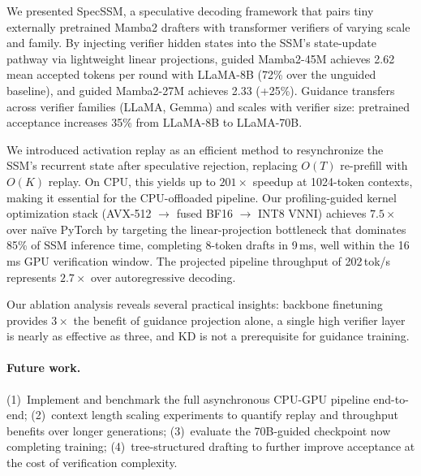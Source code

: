 We presented SpecSSM, a speculative decoding framework that pairs tiny externally pretrained Mamba2 drafters with transformer verifiers of varying scale and family.
By injecting verifier hidden states into the SSM's state-update pathway via lightweight linear projections, guided Mamba2-45M achieves 2.62 mean accepted tokens per round with LLaMA-8B (72\% over the unguided baseline), and guided Mamba2-27M achieves 2.33 (+25\%).
Guidance transfers across verifier families (LLaMA, Gemma) and scales with verifier size: pretrained acceptance increases 35\% from LLaMA-8B to LLaMA-70B.

We introduced activation replay as an efficient method to resynchronize the SSM's recurrent state after speculative rejection, replacing $O(T)$ re-prefill with $O(K)$ replay.
On CPU, this yields up to $201{\times}$ speedup at 1024-token contexts, making it essential for the CPU-offloaded pipeline.
Our profiling-guided kernel optimization stack (AVX-512 $\to$ fused BF16 $\to$ INT8 VNNI) achieves $7.5{\times}$ over na\"ive PyTorch by targeting the linear-projection bottleneck that dominates 85\% of SSM inference time, completing 8-token drafts in 9\,ms, well within the 16\,ms GPU verification window.
The projected pipeline throughput of 202\,tok/s represents $2.7{\times}$ over autoregressive decoding.

Our ablation analysis reveals several practical insights: backbone finetuning provides $3\times$ the benefit of guidance projection alone, a single high verifier layer is nearly as effective as three, and KD is not a prerequisite for guidance training.

\paragraph{Future work.}
(1)~Implement and benchmark the full asynchronous CPU-GPU pipeline end-to-end;
(2)~context length scaling experiments to quantify replay and throughput benefits over longer generations;
(3)~evaluate the 70B-guided checkpoint now completing training;
(4)~tree-structured drafting to further improve acceptance at the cost of verification complexity.
